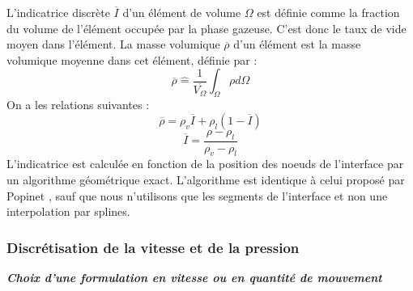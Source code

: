 L'indicatrice discrète $\overline{I}$ d'un \'el\'ement de volume $\Omega$ est d\'efinie comme la fraction du volume de l'\'el\'ement occup\'ee par la phase gazeuse. C'est donc le taux de vide moyen dans l'\'el\'ement. La masse volumique $\overline{\rho}$ d'un \'el\'ement est la masse volumique moyenne dans cet \'el\'ement, d\'efinie par :
\begin{equation}
\overline{\rho} \hat{=} \dfrac{1}{\overline{V_{\Omega}}} \int_{\Omega} \rho d\Omega
\end{equation}
On a les relations suivantes :
\begin{equation}
\overline{\rho} = \rho_{v} \overline{I} + \rho_{l} (1-\overline{I})
\end{equation}
\begin{equation}
\overline{I} = \dfrac{\rho - \rho_{l}}{\rho_{v} - \rho_{l}} \label{eq:Indicatrice_phase}
\end{equation}
L'indicatrice est calcul\'ee en fonction de la position des noeuds de l'interface par un algorithme g\'eom\'etrique exact. L'algorithme est identique \`a celui propos\'e par Popinet \cite{Popinet2000}, sauf que nous n'utilisons que les segments de l'interface et non une interpolation par splines.

\subsubsection{Discr\'etisation de la vitesse et de la pression}

\textit{\textbf{Choix d'une formulation en vitesse ou en quantit\'e de mouvement}}\smallskip \\

